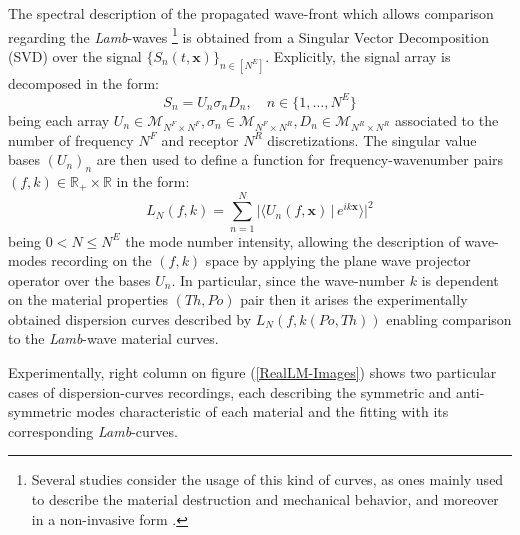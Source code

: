The spectral description of the propagated wave-front which allows comparison regarding the \textit{Lamb}-waves \footnote{Several studies consider the usage of this kind of curves, as ones mainly used to describe the material destruction and mechanical behavior, and moreover in a non-invasive form \cite{Rhee2007}.} is obtained from a Singular Vector Decomposition (SVD) over the signal $\{ S_n(t, \mathbf{x}) \}_{n \in [N^E]}$.
Explicitly, the signal array is decomposed in the form:
\begin{equation*}
    S_n = U_n \sigma_n D_n, \quad n \in \{1,\dots, N^E\}
\end{equation*}
being each array $U_n \in \mathcal{M}_{N^F\times N^F}, \sigma_n \in \mathcal{M}_{N^F\times N^R}, D_n \in \mathcal{M}_{N^R \times N^R}$ associated to the number of frequency $N^F$ and receptor $N^R$ discretizations.
The singular value bases $(U_n)_n$ are then used to define a function for frequency-wavenumber pairs $(f,k) \in \mathbb{R}_+ \times \mathbb{R}$ in the form:
\begin{equation*}
    L_N(f, k) = \sum_{n = 1}^{N} \big \vert \langle U_n(f,\mathbf{x}) \, \vert\, e^{ik\mathbf{x}} \rangle \big \vert^2
\end{equation*}
being $0 < N \leq N^E $ the mode number intensity, allowing the description of wave-modes recording on the $(f,k)$ space by applying the plane wave projector operator over the bases $U_n$. In particular, since the wave-number $k$ is dependent on the material properties $(Th, Po)$ pair then it arises the experimentally obtained dispersion curves described by $L_N(f,k(Po, Th))$ enabling comparison to the \textit{Lamb}-wave material curves.

 Experimentally, right column on figure (\ref{RealLM-Images}) shows two particular cases of dispersion-curves recordings, each describing the symmetric and anti-symmetric modes characteristic of each material and the fitting with its corresponding \textit{Lamb}-curves.

